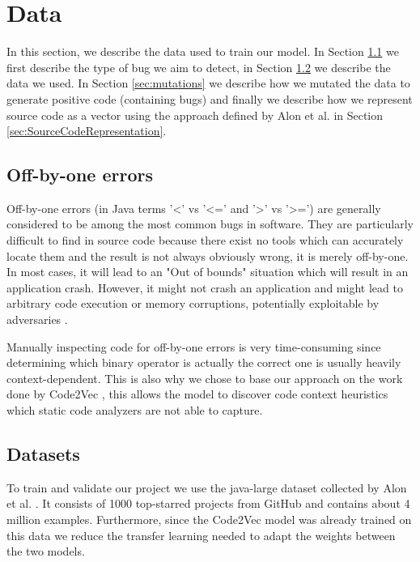 \section{Data} \label{sec:data}
In this section, we describe the data used to train our model. In Section \ref{sec:obo_errors} we first describe the type of bug we aim to detect, in Section \ref{sec:datasets} we describe the data we used. In Section \ref{sec:mutations} we describe how we mutated the data to generate positive code (containing bugs) and finally we describe how we represent source code as a vector using the approach defined by Alon et al. \cite{alon2019code2vec} in Section \ref{sec:SourceCodeRepresentation}.

\subsection{Off-by-one errors}\label{sec:obo_errors}
Off-by-one errors (in Java terms '<' vs '<=' and '>' vs '>=') are generally considered to be among the most common bugs in software\cite{dowd2006art}. They are particularly difficult to find in source code because there exist no tools which can accurately locate them and the result is not always obviously wrong, it is merely off-by-one. In most cases, it will lead to an "Out of bounds" situation which will result in an application crash. However, it might not crash an application and might lead to arbitrary code execution or memory corruptions, potentially exploitable by adversaries \cite{dowd2006softsec}. 

Manually inspecting code for off-by-one errors is very time-consuming since determining which binary operator is actually the correct one is usually heavily context-dependent. This is also why we chose to base our approach on the work done by Code2Vec \cite{alon2019code2vec}, this allows the model to discover code context heuristics which static code analyzers are not able to capture. 

\subsection{Datasets}\label{sec:datasets}

To train and validate our project we use the java-large dataset collected by Alon et al. \cite{code2seq}. It consists of 1000 top-starred projects from GitHub and contains about 4 million examples. Furthermore, since the Code2Vec model was already trained on this data we reduce the transfer learning needed to adapt the weights between the two models. 

